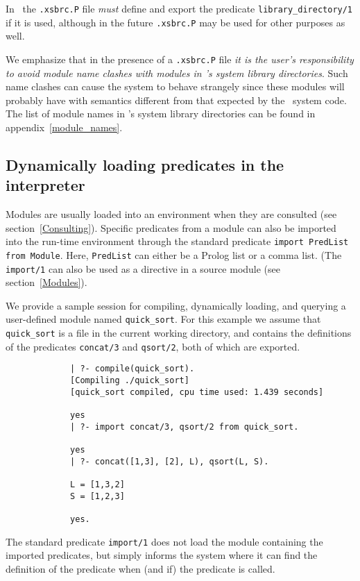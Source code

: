 In \version\ the {\verb|.xsbrc.P|} file {\em must} define and 
export the predicate {\tt library\_directory/1} if it is used, although
in the future {\verb|.xsbrc.P|} may be used for other purposes as well.

We emphasize that in the presence of a {\verb|.xsbrc.P|} file
{\em it is the user's responsibility to avoid module name clashes 
with modules in \ourprolog's system library directories}.
Such name clashes can cause the system to behave strangely since these
modules will probably have with semantics different from that expected
by the \ourprolog\ system code.  The list of module names in
\ourprolog's system library directories can be found in
appendix~\ref{module_names}.


\subsection{Dynamically loading predicates in the interpreter}
Modules are usually loaded into an environment when they are consulted
(see section~\ref{Consulting}).  Specific predicates from a module can
also be imported into the run-time environment through the standard 
predicate {\tt import PredList from Module}.
Here, {\tt PredList} can either be a Prolog list or a comma list.  (The
{\tt import/1} can also be used as a directive in a source module 
(see section~\ref{Modules}).

We provide a sample session for compiling, dynamically loading, and 
querying a user-defined module named {\tt quick\_sort}.
For this example we assume that {\tt quick\_sort} is a file in the 
current working directory, and contains the definitions of the
predicates {\tt concat/3} and {\tt qsort/2}, both of which are exported.

{\footnotesize
\begin{verbatim}
             | ?- compile(quick_sort).
             [Compiling ./quick_sort]
             [quick_sort compiled, cpu time used: 1.439 seconds]

             yes
             | ?- import concat/3, qsort/2 from quick_sort. 

             yes
             | ?- concat([1,3], [2], L), qsort(L, S).

             L = [1,3,2]
             S = [1,2,3]

             yes.
\end{verbatim}
}

The standard predicate {\tt import/1} does not load the module 
containing the imported predicates, but simply informs the system 
where it can find the definition of the predicate when (and if) the
predicate is called.
